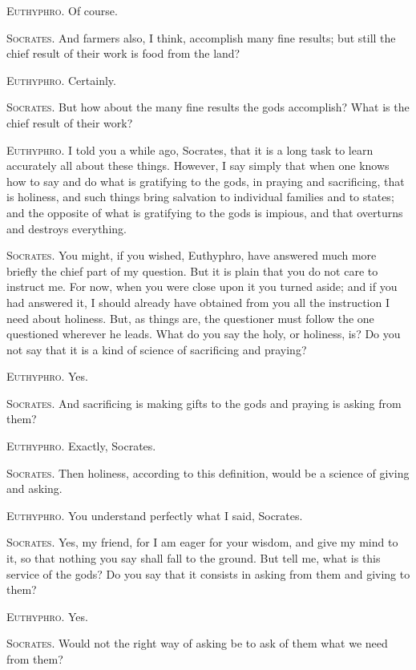 \textsc{Euthyphro}. Of course.

\textsc{Socrates}. And farmers also, I think, accomplish many fine
results; but still the chief result of their work is food from the
land?

\textsc{Euthyphro}. Certainly.

\textsc{Socrates}. But how about the many fine results the gods
accomplish? What is the chief result of their work?

\textsc{Euthyphro}. I told you a while ago, Socrates, that it is a
long task to learn accurately all about these things. However, I say
simply that when one knows how to say and do what is gratifying to the
gods, in praying and sacrificing, that is holiness, and such things
bring salvation to individual families and to states; and the opposite
of what is gratifying to the gods is impious, and that overturns and
destroys everything.


\textsc{Socrates}. You might, if you wished, Euthyphro, have answered
much more briefly the chief part of my question. But it is plain that
you do not care to instruct me. For now, when you were close upon it
you turned aside; and if you had answered it, I should already have
obtained from you all the instruction I need about holiness. But, as
things are, the questioner must follow the one questioned wherever he
leads. What do you say the holy, or  holiness, is? Do you not
say that it is a kind of science of sacrificing and praying?

\textsc{Euthyphro}. Yes.

\textsc{Socrates}. And sacrificing is making gifts to the gods and
praying is asking from them?

\textsc{Euthyphro}. Exactly, Socrates.

\textsc{Socrates}. Then holiness, according to this definition, would
be a science of giving and asking.

\textsc{Euthyphro}. You understand perfectly what I said, Socrates.

\textsc{Socrates}. Yes, my friend, for I am eager for your wisdom, and
give my mind to it, so that nothing you say shall fall to the ground.
But tell me, what is this service of the gods? Do you say that it
consists in asking from them and giving to them?

\textsc{Euthyphro}. Yes.

\textsc{Socrates}. Would not the right way of asking be to ask of them
what we need from them?

